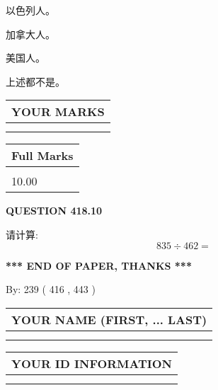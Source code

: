 \documentclass{ctexart}
\begin{document}
 
以色列人。
 
 
加拿大人。
 
 
美国人。
 
 
 上述都不是。
 
 
  
\vspace{0.2in}
  
\noindent\begin{tabular}{|l|}
\hline
 YOUR MARKS  \\
\hline
 \\ 
 \\ 
\hline
\end{tabular}
\hspace{0.05in} \begin{tabular}{|l|}
\hline
 Full Marks  \\
\hline
 \\ 
10.00 \\
\hline
\end{tabular}
{\textbf{\Large{QUESTION
418.10 
}}}
  
  
 
请计算:
\begin{equation}
835  \div    %
462 = \nonumber
\end{equation}
 

 

 
   
   
 \vspace{0.2in}
 
   
   
   
   
\vspace{1.0in} 
{\textbf{\large{ *** END OF PAPER, THANKS *** }}} 
   
   
\hspace{1.0in} By: 
 239 ( 416 ,  443 )
   
   
   
   
\newpage 
\setcounter{page}{ 
   419001 } 
   
   
   
   
\noindent\begin{tabular}{|l|}
\hline
YOUR NAME (FIRST, ... LAST)  \\
\hline
 \\ 
 \\ 
\hline
\end{tabular}
\hspace{0.05in} \begin{tabular}{|l|}
\hline
 YOUR   ID   INFORMATION  \\
\hline
 \\ 
 \\ 
\hline
\end{tabular}
   
\end{document}
